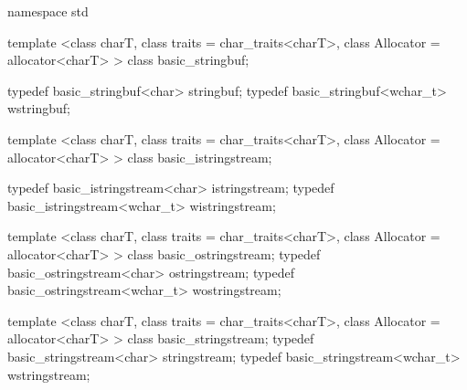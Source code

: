 %
%
%
%
%
%
%
%
%
%
%
%
\begin{codeblock}
namespace std {
  template <class charT, class traits = char_traits<charT>,
        class Allocator = allocator<charT> >
    class basic_stringbuf;

  typedef basic_stringbuf<char>     stringbuf;
  typedef basic_stringbuf<wchar_t> wstringbuf;

  template <class charT, class traits = char_traits<charT>,
        class Allocator = allocator<charT> >
    class basic_istringstream;

  typedef basic_istringstream<char>     istringstream;
  typedef basic_istringstream<wchar_t> wistringstream;

  template <class charT, class traits = char_traits<charT>,
        class Allocator = allocator<charT> >
    class basic_ostringstream;
  typedef basic_ostringstream<char>     ostringstream;
  typedef basic_ostringstream<wchar_t> wostringstream;

  template <class charT, class traits = char_traits<charT>,
        class Allocator = allocator<charT> >
    class basic_stringstream;
  typedef basic_stringstream<char>     stringstream;
  typedef basic_stringstream<wchar_t> wstringstream;
}
\end{codeblock}

